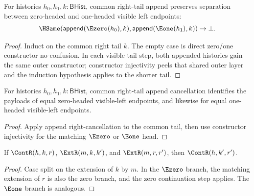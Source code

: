 \begin{theorem}
\label{thm:append-visible-left-same-tail-tag-separation}
For histories $h_0,h_1,k:\mathsf{BHist}$, common right-tail append preserves
separation between zero-headed and one-headed visible left endpoints:
$$
\HSame(\mathsf{append}(\Ezero(h_0),k),
\mathsf{append}(\Eone(h_1),k))\to\bot.
$$
\end{theorem}
\begin{proof}
Induct on the common right tail $k$. The empty case is direct zero/one
constructor no-confusion. In each visible tail step, both appended histories
gain the same outer constructor; constructor injectivity peels that shared
outer layer and the induction hypothesis applies to the shorter tail.
\end{proof}

\begin{theorem}
\label{thm:append-visible-left-same-tag-tail-cancel}
For histories $h_0,h_1,k:\mathsf{BHist}$, common right-tail append cancellation identifies the payloads of equal zero-headed visible-left endpoints, and likewise for equal one-headed visible-left endpoints.
\end{theorem}
\begin{proof}
Apply append right-cancellation to the common tail, then use constructor injectivity for the matching \(\Ezero\) or \(\Eone\) head.
\end{proof}

\begin{lemma}
\label{lem:cont-ext-right-step}
If $\ContR(h,k,r)$, $\ExtR(m,k,k')$, and $\ExtR(m,r,r')$, then
$\ContR(h,k',r')$.
\end{lemma}
\begin{proof}
Case split on the extension of $k$ by $m$. In the $\Ezero$ branch, the matching extension of $r$ is also the zero branch, and the zero continuation step applies. The $\Eone$ branch is analogous.
\end{proof}

